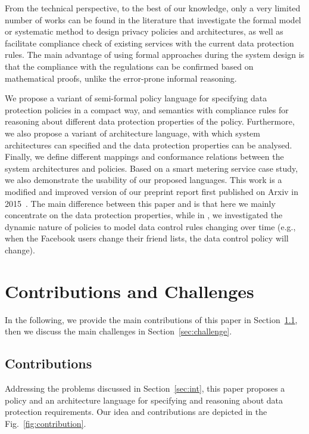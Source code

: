 \documentclass[a4paper]{article}
\begin{document}
From the technical perspective, to the best of our knowledge,  only a very limited number of works can be found in the literature that investigate the  formal model or systematic method to design privacy policies and architectures, as well as facilitate compliance check of existing services with the current data protection rules. The main advantage of using formal approaches during the system design is that the compliance with the regulations can be confirmed based on mathematical proofs, unlike the error-prone informal reasoning. 

We propose a variant of semi-formal policy language for specifying data protection policies in a compact way, and semantics with compliance rules for reasoning about different data protection properties of the policy. Furthermore, we also propose a variant of  architecture language, with which system architectures can specified and the data protection properties can be analysed. Finally, we define different mappings and conformance relations between the system architectures and policies. Based on a smart metering service case study, we also demonstrate the usability of our proposed languages.
This work is a modified and improved version of our preprint report first published on Arxiv in 2015~\cite{TaArxiv15}. The main difference between this paper and \cite{TaArxiv15} is that here we mainly concentrate on the data protection properties, while in \cite{TaArxiv15}, we investigated the dynamic nature of policies to model data control rules changing over time (e.g., when the Facebook users change their friend lists, the data control policy will change). 

\section{Contributions and Challenges}
\label{sec:motcont} 

In the following, we provide the main contributions of this paper in Section~\ref{sec:cont}, then we discuss the main challenges in Section~\ref{sec:challenge}. 
     

\subsection{Contributions}
\label{sec:cont}

Addressing the problems discussed in Section~\ref{sec:int}, this paper proposes a policy and an architecture language for specifying and reasoning about data protection requirements. Our idea and contributions are depicted in the Fig.~\ref{fig:contribution}. 
\end{document}
